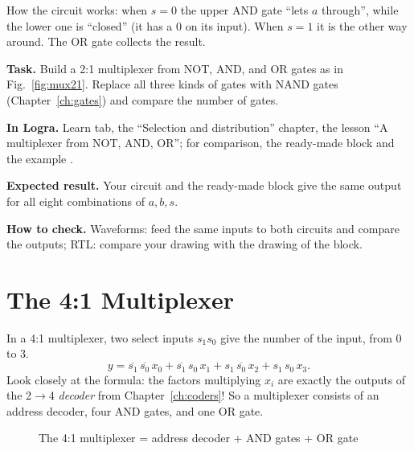 How the circuit works: when $s = 0$ the upper AND gate ``lets $a$ through'',
while the lower one is ``closed'' (it has a 0 on its input). When $s = 1$ it is
the other way around. The OR gate collects the result.

\begin{diybox}
\textbf{Task.}  Build a 2:1 multiplexer from NOT, AND, and OR gates as
in Fig.~\ref{fig:mux21}.  Replace all three kinds of gates with NAND
gates (Chapter~\ref{ch:gates}) and compare the number of gates.

\textbf{In Logra.} Learn tab, the ``Selection and distribution'' chapter, the
lesson ``A multiplexer from NOT, AND, OR''; for comparison, the ready-made block
and the example .

\textbf{Expected result.} Your circuit and the ready-made block give the same
output for all eight combinations of $a,b,s$.

\textbf{How to check.} Waveforms: feed the same inputs to both circuits and
compare the outputs; RTL: compare your drawing with the drawing of the block.
\end{diybox}

\section{The 4:1 Multiplexer}

In a 4:1 multiplexer, two select inputs $s_1 s_0$ give the number of the input,
from 0 to 3.
\[
  y = \overline{s_1}\,\overline{s_0}\,x_0 + \overline{s_1}\,s_0\,x_1 + s_1\,\overline{s_0}\,x_2 + s_1\,s_0\,x_3.
\]
Look closely at the formula: the factors multiplying $x_i$ are exactly the
outputs of the 2$\to$4 \emph{decoder} from Chapter~\ref{ch:coders}! So a
multiplexer consists of an address decoder, four AND gates, and one OR gate.

\begin{figure}[H]
\centering
{}
\caption{The 4:1 multiplexer = address decoder + AND gates + OR gate}
\label{fig:mux41}
\end{figure}

